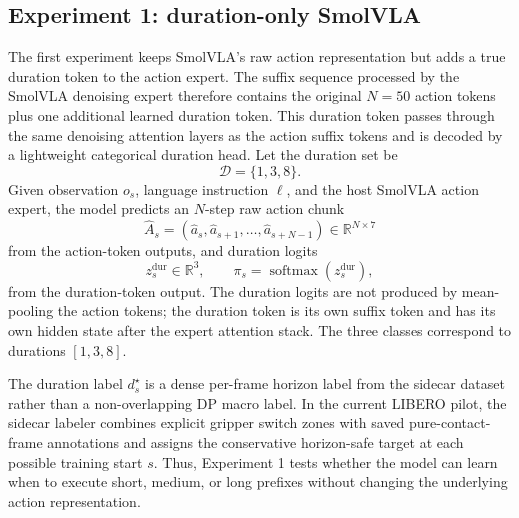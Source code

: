 \documentclass[10pt,twocolumn,letterpaper]{article}
\begin{document}
\subsection{Experiment 1: duration-only SmolVLA}
\label{app:exp-duration-only}
The first experiment keeps SmolVLA's raw action representation but adds a true duration token to the action expert. The suffix sequence processed by the SmolVLA denoising expert therefore contains the original $N=50$ action tokens plus one additional learned duration token. This duration token passes through the same denoising attention layers as the action suffix tokens and is decoded by a lightweight categorical duration head. Let the duration set be
\begin{equation}
\mathcal{D}=\{1,3,8\}.
\end{equation}
Given observation $o_s$, language instruction $\ell$, and the host SmolVLA action expert, the model predicts an $N$-step raw action chunk
\begin{equation}
\hat A_s=(\hat a_s,\hat a_{s+1},\ldots,\hat a_{s+N-1})\in\mathbb{R}^{N\times 7}
\end{equation}
from the action-token outputs, and duration logits
\begin{equation}
z_s^{\mathrm{dur}}\in\mathbb{R}^{3},
\qquad
\pi_s=\operatorname{softmax}(z_s^{\mathrm{dur}}),
\end{equation}
from the duration-token output. The duration logits are not produced by mean-pooling the action tokens; the duration token is its own suffix token and has its own hidden state after the expert attention stack. The three classes correspond to durations $[1,3,8]$.

The duration label $d_s^\star$ is a dense per-frame horizon label from the sidecar dataset rather than a non-overlapping DP macro label. In the current LIBERO pilot, the sidecar labeler combines explicit gripper switch zones with saved pure-contact-frame annotations and assigns the conservative horizon-safe target at each possible training start $s$. Thus, Experiment 1 tests whether the model can learn when to execute short, medium, or long prefixes without changing the underlying action representation.
\end{document}
